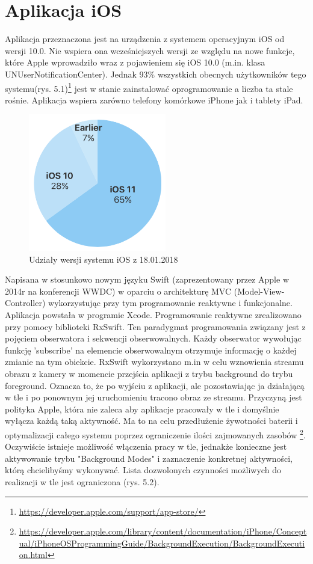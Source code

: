 \section*{Aplikacja iOS}
Aplikacja przeznaczona jest na urządzenia z systemem operacyjnym iOS od wersji 10.0. 
Nie wspiera ona wcześniejszych wersji ze względu na nowe funkcje, które Apple wprowadziło wraz z pojawieniem się iOS 10.0 (m.in. klasa UNUserNotificationCenter). Jednak 93\% wszystkich obecnych użytkowników tego systemu(rys. 5.1)\footnote{\url{https://developer.apple.com/support/app-store/}} jest w stanie zainstalować oprogramowanie a liczba ta stale rośnie. Aplikacja wspiera zarówno telefony komórkowe iPhone jak i tablety iPad. 
\begin{figure}[ht]
	\centering
	\includegraphics[width=6cm]{iOSstat}
	\caption{Udziały wersji systemu iOS z 18.01.2018}
\end{figure}
Napisana w stosunkowo nowym języku Swift (zaprezentowany przez Apple w 2014r na konferencji WWDC) w oparciu o architekturę MVC (Model-View-Controller) wykorzystując przy tym programowanie reaktywne i funkcjonalne. Aplikacja powstała w programie Xcode. Programowanie reaktywne zrealizowano przy pomocy biblioteki RxSwift. Ten paradygmat programowania związany jest z pojęciem obserwatora i sekwencji obserwowalnych. Każdy obserwator wywołując funkcję 'subscribe' na elemencie obserwowalnym otrzymuje informację o każdej zmianie na tym obiekcie. RxSwift wykorzystano m.in w celu wznowienia streamu obrazu z kamery w momencie przejścia aplikacji z trybu background do trybu foreground. Oznacza to, że po wyjściu z aplikacji, ale pozostawiając ja działającą w tle i po ponownym jej uruchomieniu tracono obraz ze streamu. Przyczyną jest polityka Apple, która nie zaleca aby aplikacje pracowały w tle i domyślnie wyłącza każdą taką aktywność. Ma to na celu przedłużenie żywotności baterii i optymalizacji całego systemu poprzez ograniczenie ilości zajmowanych zasobów \footnote{\url{https://developer.apple.com/library/content/documentation/iPhone/Conceptual/iPhoneOSProgrammingGuide/BackgroundExecution/BackgroundExecution.html}}.  Oczywiście istnieje możliwość włączenia pracy w tle, jednakże konieczne jest aktywowanie trybu "Background Modes" i zaznaczenie konkretnej aktywności, którą chcielibyśmy wykonywać. Lista dozwolonych czynności możliwych do realizacji w tle jest ograniczona (rys. 5.2). 
